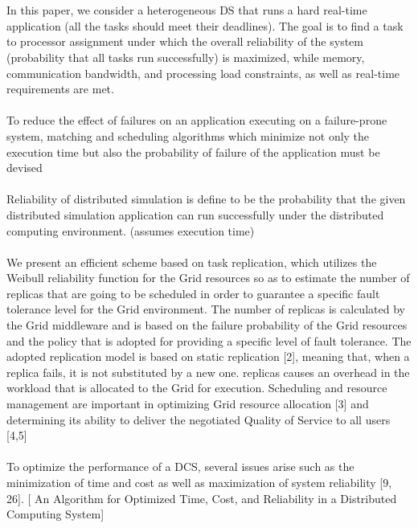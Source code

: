 \documentclass{cslthse-msc}
\begin{document}
\\\\
In this paper, we consider a heterogeneous DS that runs a hard real-time application (all the tasks should meet their deadlines). The goal is to find a task to processor assignment under which the overall reliability of the system (probability that all tasks run successfully) is maximized, while memory, communication bandwidth, and processing load constraints, as well as real-time requirements are met. \cite{optTaskAllocationForMaxRel}
\\\\
To reduce the effect of failures on an application executing on a failure-prone system, matching and scheduling algorithms which minimize not only the execution time but also the probability of failure of the application must be devised \cite{algoMinExTime}
\\\\
Reliability of distributed simulation is define to be the probability that the given distributed simulation application can run successfully under the distributed computing environment. (assumes execution time) \cite{relModelDistSimSystem}
\\\\
We present an efficient scheme based on task replication, which utilizes the Weibull reliability function for the Grid resources so as to estimate the number of replicas that are going to be scheduled in order to guarantee a specific fault tolerance level for the Grid environment. The number of replicas is calculated by the Grid middleware and is based on the failure probability of the Grid resources and the policy that is adopted for providing a specific level of fault tolerance. The adopted replication model is based on static replication [2], meaning that, when a replica fails, it is not substituted by a new one. replicas causes an overhead in the workload that is allocated to the Grid for execution. Scheduling and resource management are important in optimizing Grid resource allocation [3] and determining its ability to deliver the negotiated Quality of Service to all users [4,5] \cite{effTaskReplMobGrid}
\\\\
To optimize the performance of a DCS, several issues arise such as the minimization of time and cost as well as maximization of system reliability [9, 26]. [	An Algorithm for Optimized Time, Cost, and Reliability in a Distributed Computing
System]
\\\\
\end{document}

